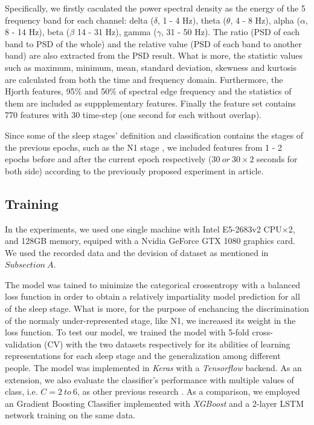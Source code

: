 \documentclass[journal]{IEEEtran}
\begin{document}
Specifically, we firstly caculated the power spectral density as the energy of the 5 frequency band for each channel: delta ($\delta$, 1 - 4 Hz), theta ($\theta$, 4 - 8 Hz), alpha ($\alpha$, 8 - 14 Hz), beta ($\beta$ 14 - 31 Hz), gamma ($\gamma$, 31 - 50 Hz). The ratio (PSD of each band to PSD of the whole) and the relative value (PSD of each band to another band) are also extracted from the PSD result. What is more, the statistic values such as maximum, minimum, mean, standard deviation, skewness and kurtosis are calculated from both the time and frequency domain. Furthermore, the Hjorth features, 95\% and 50\% of spectral edge frequency and the statistics of them are included as suppplementary features. Finally the feature set contains 770 features with 30 time-step (one second for each without overlap).

Since some of the sleep stages' definition and classification contains the stages of the previous epochs, such as the N1 stage \cite{berry2012aasm}, we included features from 1 - 2 epochs before and after the current epoch respectively ($30\ or\ 30\times 2$ seconds for both side) according to the previously proposed experiment in article\cite{chambon2017deep}.
\subsection{Training}
In the experiments, we used one single machine with Intel E5-2683v2 CPU$\times$2, and 128GB memory, equiped with a Nvidia GeForce GTX 1080 graphics card. We used the recorded data and the devision of dataset as mentioned in $Subsection\ A$. 

The model was tained to minimize the categorical crossentropy with a balanced loss function in order to obtain a relatively impartiality model prediction for all of the sleep stage. What is more, for the purpose of enchancing the discrimination of the normaly under-represented stage, like N1, we increased its weight in the loss function. To test our model, we trained the model with 5-fold cross-validation (CV) with the two datasets respectively for its abilities of learning representations for each sleep stage and the generalization among different people. The model was implemented in \emph{Keras} with a \emph{Tensorflow} backend. As an extension, we also evaluate the classifier's performance with multiple values of class, i.e. $C = 2\ to\ 6$, as other previous research \cite{nakamura2017complexity}. As a comparison, we employed an Gradient Boosting Classifier implemented with \emph{XGBoost} \cite{Chen2016XGBoost} and a 2-layer LSTM network training on the same data.
\end{document}
